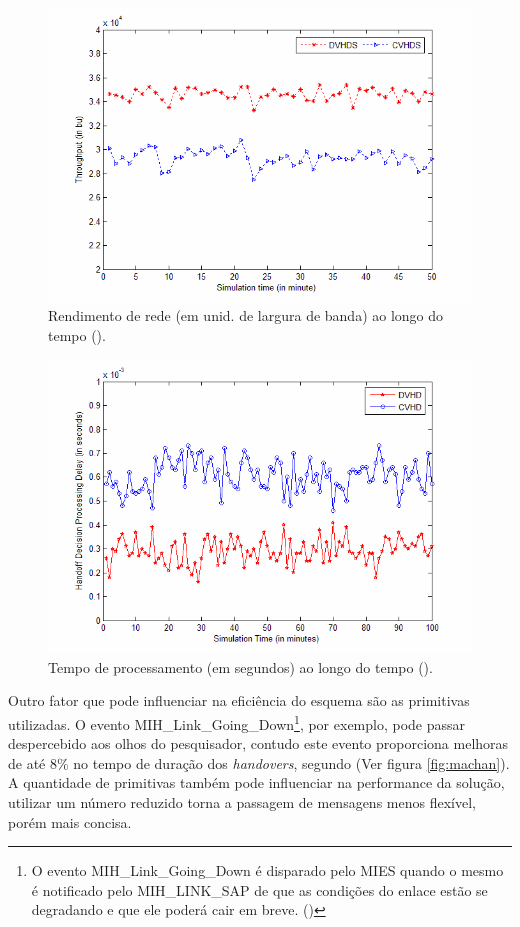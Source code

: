 \documentclass[12pt]{article}
\begin{document}
\begin{figure}[ht]
	\centering
	\includegraphics[width=.8\textwidth]{pre-projeto/dvhds-throughput.png}
	\caption{Rendimento de rede (em unid. de largura de banda) ao longo do 
	tempo (\cite{tawil:2008}).}
	\label{fig:dvhds-throughput}
\end{figure}

\begin{figure}[ht]
	\centering
	\includegraphics[width=.8\textwidth]{pre-projeto/dvhds-procdelay.png}
	\caption{Tempo de processamento (em segundos) ao longo do tempo 
	(\cite{tawil:2008}).}
	\label{fig:dvhds-procdelay}
\end{figure}





Outro fator que pode influenciar na eficiência do esquema são as primitivas 
utilizadas.  O evento MIH\_Link\_Going\_Down\footnote{O evento 	
MIH\_Link\_Going\_Down é disparado pelo MIES quando o mesmo é notificado pelo 
MIH\_LINK\_SAP de que as condições do enlace estão se degradando e que ele 
poderá cair em breve.  (\cite{ieee:2008:80221})}, por exemplo,  pode passar 
despercebido aos olhos do pesquisador, contudo este evento proporciona 
melhoras de até 8\% no tempo de duração dos \textit{handovers}, segundo 
\cite{machan:2008} (Ver figura \ref{fig:machan}).  A quantidade de primitivas 
também pode influenciar na performance da solução, utilizar um número reduzido 
torna a passagem de mensagens menos flexível, porém mais concisa.
\end{document}
